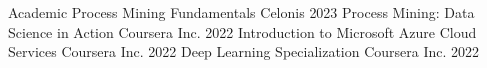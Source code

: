 


\begin{cvhonors}

  \cvhonor
    {Academic Process Mining Fundamentals} %
    {Celonis} %
    {} %
    {2023} %
  \cvhonor
    {Process Mining: Data Science in Action} %
    {Coursera Inc.} %
    {} %
    {2022} %
  \cvhonor
    {Introduction to Microsoft Azure Cloud Services} %
    {Coursera Inc.} %
    {} %
    {2022} %
  \cvhonor
    {Deep Learning Specialization} %
    {Coursera Inc.} %
    {} %
    {2022} %
\end{cvhonors}